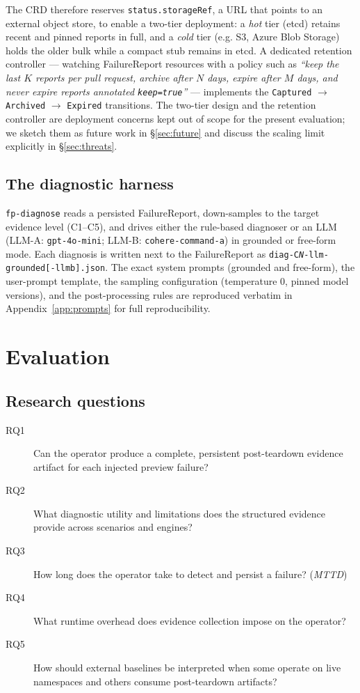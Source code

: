 \documentclass[sigconf, nonacm=true, anonymous=false, review=false]{acmart}
\newcommand{\RQ}[1]{RQ#1\xspace}
\newcommand{\fp}{FailureReport\xspace}
\newcommand{\Cn}[1]{C#1\xspace}
\begin{document}
The CRD therefore reserves \texttt{status.storageRef}, a URL that
points to an external object store, to enable a two-tier deployment:
a \emph{hot} tier (etcd) retains recent and pinned reports in full,
and a \emph{cold} tier (e.g. S3, Azure Blob Storage) holds the older
bulk while a compact stub remains in etcd. A dedicated retention
controller --- watching \fp{} resources with a policy such as
\emph{``keep the last $K$ reports per pull request, archive after
$N$ days, expire after $M$ days, and never expire reports annotated
\texttt{keep=true}''} --- implements the \texttt{Captured} $\to$
\texttt{Archived} $\to$ \texttt{Expired} transitions. The two-tier
design and the retention controller are deployment concerns kept out
of scope for the present evaluation; we sketch them as future work in
§\ref{sec:future} and discuss the scaling limit explicitly in
§\ref{sec:threats}.

\subsection{The diagnostic harness}
\label{sec:approach-harness}

\texttt{fp-diagnose} reads a persisted \fp{}, down-samples to the
target evidence level (\Cn{1}--\Cn{5}), and drives either the rule-based
diagnoser or an LLM (LLM-A: \texttt{gpt-4o-mini}; LLM-B:
\texttt{cohere-command-a}) in grounded or free-form mode. Each
diagnosis is written next to the \fp{} as \texttt{diag-C\textit{N}-llm-grounded[-llmb].json}.
The exact system prompts (grounded and free-form), the user-prompt
template, the sampling configuration (temperature 0, pinned model
versions), and the post-processing rules are reproduced verbatim in
Appendix~\ref{app:prompts} for full reproducibility.

\section{Evaluation}
\label{sec:eval}

\subsection{Research questions}
\label{sec:eval-rq}

\begin{description}
  \item[\RQ{1}] Can the operator produce a complete, persistent
    post-teardown evidence artifact for each injected preview failure?
  \item[\RQ{2}] What diagnostic utility and limitations does the
    structured evidence provide across scenarios and engines?
  \item[\RQ{3}] How long does the operator take to detect and persist a
    failure? (\emph{MTTD})
  \item[\RQ{4}] What runtime overhead does evidence collection impose
    on the operator?
  \item[\RQ{5}] How should external baselines be interpreted when some
    operate on live namespaces and others consume post-teardown artifacts?
\end{description}
\end{document}
